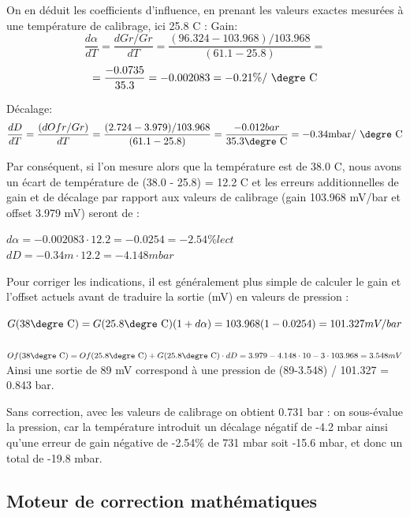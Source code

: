 On en déduit les coefficients d'influence, en prenant les valeurs exactes mesurées à une température de calibrage, ici 25.8 \degre C :
Gain:
\[
    \frac{d\alpha}{dT} = \frac{dGr/Gr}{dT} = \frac{(96.324-103.968)/103.968}{ (61.1-25.8)} =\]
\begin{equation}
    = \frac{-0.0735}{35.3} = -0.002083 = -0.21 \% \text{/ \degre C}
\end{equation}

Décalage:
\begin{equation}
    \frac{dD}{dT} = \frac{(dOfr/Gr)}{dT} = \frac{(2.724-3.979)/103.968}{(61.1-25.8)} =
    \frac{-0.012 bar}{ 35.3 \text{\degre C}} = -0.34 \text{mbar/ \degre C}
\end{equation}

Par conséquent, si l'on mesure alors que la température est de 38.0 \degre C, nous avons un écart de température de (38.0 - 25.8) = 12.2 \degre C et les erreurs additionnelles de gain et de décalage par rapport aux valeurs de calibrage (gain 103.968 mV/bar et offset 3.979 mV) seront de :

$d\alpha = -0.002083 \cdot 12.2 = -0.0254 = -2.54 \% lect $
\\
$dD = -0.34 m \cdot 12.2 = - 4.148 mbar $

Pour corriger les indications, il est généralement plus simple de calculer le gain et l'offset actuels avant de traduire la sortie (mV) en valeurs de pression :

$G(38 \text{\degre C}) = G(25.8 \text{\degre C}) (1 + d \alpha) = 103.968(1-0.0254) = 101.327 mV/bar $
\\
\\
$Of(38 \text{\degre C}) = Of(25.8 \text{\degre C}) + G(25.8 \text{\degre C}) \cdot dD = 3.979 - 4.148 \cdot 10-3 \cdot 103.968 = 3.548 mV$
\\

Ainsi une sortie de 89 mV correspond à une pression de (89-3.548) / 101.327 = 0.843 bar.

Sans correction, avec les valeurs de calibrage on obtient 0.731 bar : on sous-évalue la pression, car la température introduit un décalage négatif de -4.2 mbar ainsi qu'une erreur de gain négative de -2.54\% de 731 mbar soit -15.6 mbar, et donc un total de -19.8 mbar.

\subsection{Moteur de correction mathématiques}

